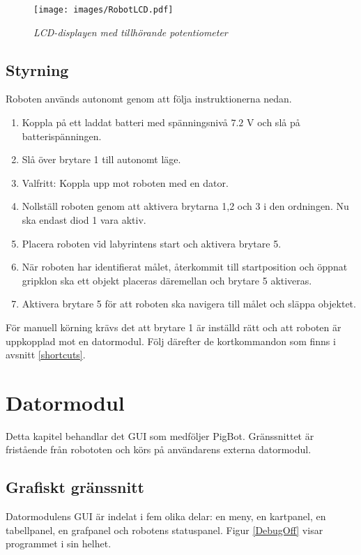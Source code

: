 \documentclass[11pt]{article}
\begin{document}
\begin{figure}[htbp]
	\centering
	\texttt{[image: images/RobotLCD.pdf]}
	\caption{\textit{LCD-displayen med tillhörande potentiometer} \label{lcdPot}}
\end{figure}



\subsection{Styrning}
Roboten används autonomt genom att följa instruktionerna nedan.
\begin{enumerate}
    \renewcommand*\labelenumi{\theenumi\vspace{1pt} - }
  \item Koppla på ett laddat batteri med spänningsnivå $7.2$ V och slå på batterispänningen.
  \item Slå över brytare 1 till autonomt läge.
    \renewcommand*\labelenumi{(\theenumi)\vspace{1pt} - }

  \item Valfritt: Koppla upp mot roboten med en dator.
    \renewcommand*\labelenumi{\theenumi\vspace{1pt} - }
  \item Nollställ roboten genom att aktivera brytarna 1,2 och 3 i den ordningen. Nu ska endast diod 1 vara aktiv.
  \item Placera roboten vid labyrintens start och aktivera brytare 5. 
  \item När roboten har identifierat målet, återkommit till startposition och öppnat gripklon ska ett objekt placeras däremellan och brytare 5 aktiveras.
  \item Aktivera brytare 5 för att roboten ska navigera till målet och släppa objektet. 
\end{enumerate}

För manuell körning krävs det att brytare 1 är inställd rätt och att roboten är uppkopplad mot en datormodul. Följ därefter de kortkommandon som finns i avsnitt \ref{shortcuts}.


\section{Datormodul}
Detta kapitel behandlar det GUI som medföljer PigBot. Gränssnittet är fristående från robototen och körs på användarens externa datormodul.

\subsection{Grafiskt gränssnitt}
Datormodulens GUI är indelat i fem olika delar: en meny, en kartpanel, en tabellpanel, en grafpanel och robotens statuspanel. Figur \ref{DebugOff} visar programmet i sin helhet.
\end{document}
